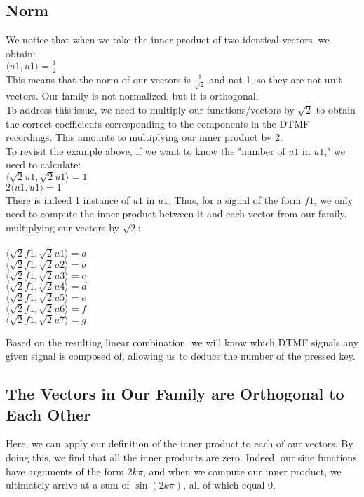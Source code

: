 \subsection{Norm}
We notice that when we take the inner product of two identical vectors, we obtain:
\\
\( \langle u1, u1 \rangle = \frac{1}{2} \)
\\
This means that the norm of our vectors is \( \frac{1}{\sqrt{2}} \) and not 1, so they are not unit vectors. Our family is not normalized, but it is orthogonal.
\\
To address this issue, we need to multiply our functions/vectors by \( \sqrt{2} \) to obtain the correct coefficients corresponding to the components in the DTMF recordings. This amounts to multiplying our inner product by 2.
\\
To revisit the example above, if we want to know the "number of \( u1 \) in \( u1 \)," we need to calculate:
\\
\( \langle \sqrt{2}u1, \sqrt{2}u1 \rangle = 1 \)
\\
\( 2\langle u1, u1 \rangle = 1 \)
\\
There is indeed 1 instance of \( u1 \) in \( u1 \).
Thus, for a signal of the form \( f1 \), we only need to compute the inner product between it and each vector from our family, multiplying our vectors by \( \sqrt{2} \):
\\
\\
\( \langle \sqrt{2}f1, \sqrt{2}u1 \rangle = a \)
\\
\( \langle \sqrt{2}f1, \sqrt{2}u2 \rangle = b \)
\\
\( \langle \sqrt{2}f1, \sqrt{2}u3 \rangle = c \)
\\
\( \langle \sqrt{2}f1, \sqrt{2}u4 \rangle = d \)
\\
\( \langle \sqrt{2}f1, \sqrt{2}u5 \rangle = e \)
\\
\( \langle \sqrt{2}f1, \sqrt{2}u6 \rangle = f \)
\\
\( \langle \sqrt{2}f1, \sqrt{2}u7 \rangle = g \)

Based on the resulting linear combination, we will know which DTMF signals any given signal is composed of, allowing us to deduce the number of the pressed key.

\subsection{The Vectors in Our Family are Orthogonal to Each Other}
Here, we can apply our definition of the inner product to each of our vectors. By doing this, we find that all the inner products are zero. Indeed, our sine functions have arguments of the form \( 2k\pi \), and when we compute our inner product, we ultimately arrive at a sum of \( \sin(2k\pi) \), all of which equal 0.

